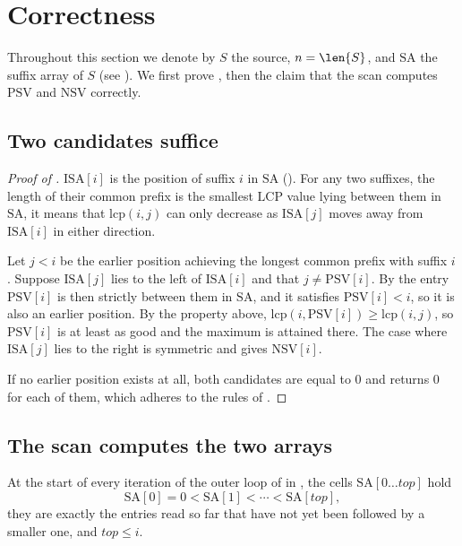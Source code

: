 \section{Correctness}

Throughout this section we denote by \(S\) the source, \(n = \len{S}\), and \(\mathrm{SA}\) the suffix array of \(S\) (see ). We first prove , then the claim that the scan computes \(\mathrm{PSV}\) and \(\mathrm{NSV}\) correctly.

\subsection{Two candidates suffice}
\begin{proof}[Proof of ]
    \(\mathrm{ISA}[i]\) is the position of suffix \(i\) in \(\mathrm{SA}\) (). For any two suffixes, the length of their common prefix is the smallest \(\mathrm{LCP}\) value lying between them in \(\mathrm{SA}\), it means that \(\mathrm{lcp}(i, j)\) can only decrease as \(\mathrm{ISA}[j]\) moves away from \(\mathrm{ISA}[i]\) in either direction.

    Let \(j < i\) be the earlier position achieving the longest common prefix with suffix \(i\). Suppose \(\mathrm{ISA}[j]\) lies to the left of \(\mathrm{ISA}[i]\) and that \(j \neq \mathrm{PSV}[i]\). By  the entry \(\mathrm{PSV}[i]\) is then strictly between them in \(\mathrm{SA}\), and it satisfies \(\mathrm{PSV}[i] < i\), so it is also an earlier position. By the property above, \(\mathrm{lcp}(i, \mathrm{PSV}[i]) \geq \mathrm{lcp}(i, j)\), so \(\mathrm{PSV}[i]\) is at least as good and the maximum is attained there. The case where \(\mathrm{ISA}[j]\) lies to the right is symmetric and gives \(\mathrm{NSV}[i]\).

    If no earlier position exists at all, both candidates are equal to \(0\) and  returns \(0\) for each of them, which adheres to the rules of .
\end{proof}

\subsection*{The scan computes the two arrays}

\begin{lemma}
\label{lem:kkp-stack}
    At the start of every iteration of the outer loop of  in , the cells \(\mathrm{SA}[0 \ldots \mathit{top}]\) hold
    \[
        \mathrm{SA}[0] = 0 < \mathrm{SA}[1] < \cdots < \mathrm{SA}[\mathit{top}],
    \]
    they are exactly the entries read so far that have not yet been followed by a smaller one, and \(\mathit{top} \leq i\).
\end{lemma}

